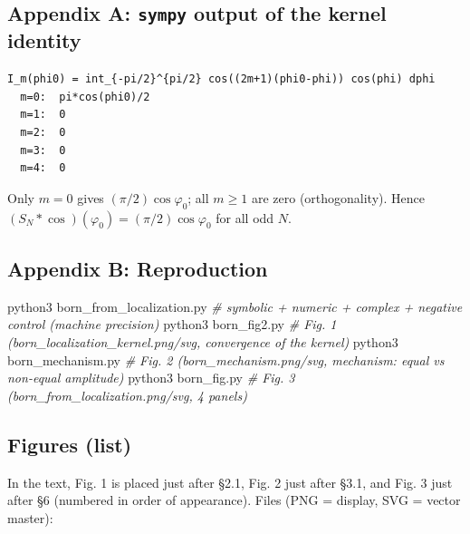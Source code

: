 \documentclass[
]{ltjsarticle}
\newenvironment{Shaded}{}{}
\newcommand{\CommentTok}[1]{\textcolor[rgb]{0.38,0.63,0.69}{\textit{#1}}}
\newcommand{\ExtensionTok}[1]{#1}
\newcommand{\NormalTok}[1]{#1}
\begin{document}
\subsection{\texorpdfstring{Appendix A: \texttt{sympy} output of the
kernel
identity}{Appendix A: sympy output of the kernel identity}}\label{appendix-a-sympy-output-of-the-kernel-identity}

\begin{verbatim}
I_m(phi0) = int_{-pi/2}^{pi/2} cos((2m+1)(phi0-phi)) cos(phi) dphi
  m=0:  pi*cos(phi0)/2
  m=1:  0
  m=2:  0
  m=3:  0
  m=4:  0
\end{verbatim}

Only \(m=0\) gives \((\pi/2)\cos\varphi_0\); all \(m\ge1\) are zero
(orthogonality). Hence \((S_N*\cos)(\varphi_0)=(\pi/2)\cos\varphi_0\)
for all odd \(N\).

\subsection{Appendix B: Reproduction}\label{appendix-b-reproduction}

\begin{Shaded}
\begin{Highlighting}[]
\ExtensionTok{python3}\NormalTok{ born\_from\_localization.py     }\CommentTok{\# symbolic + numeric + complex + negative control (machine precision)}
\ExtensionTok{python3}\NormalTok{ born\_fig2.py                   }\CommentTok{\# Fig. 1 (born\_localization\_kernel.png/svg, convergence of the kernel)}
\ExtensionTok{python3}\NormalTok{ born\_mechanism.py              }\CommentTok{\# Fig. 2 (born\_mechanism.png/svg, mechanism: equal vs non{-}equal amplitude)}
\ExtensionTok{python3}\NormalTok{ born\_fig.py                    }\CommentTok{\# Fig. 3 (born\_from\_localization.png/svg, 4 panels)}
\end{Highlighting}
\end{Shaded}

\subsection{Figures (list)}\label{figures-list}

In the text, Fig. 1 is placed just after §2.1, Fig. 2 just after §3.1,
and Fig. 3 just after §6 (numbered in order of appearance). Files (PNG =
display, SVG = vector master):
\end{document}
